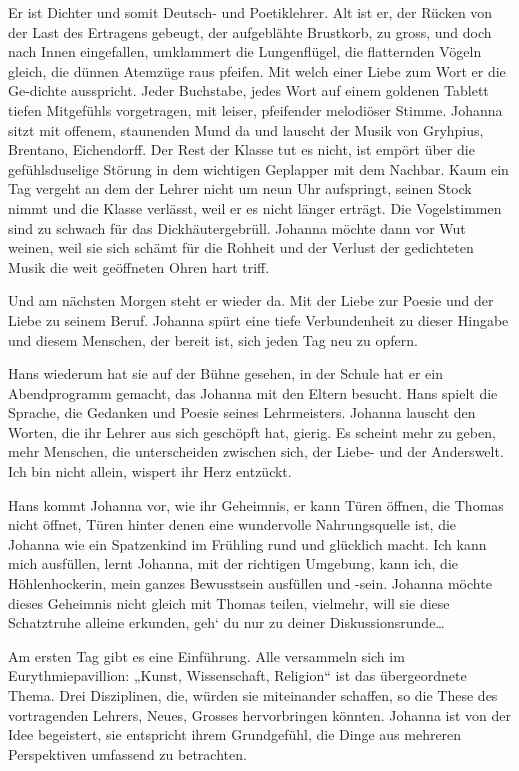 \documentclass[10pt,titlepage,a5paper]{book}
\begin{document}
Er ist Dichter und somit Deutsch- und Poetiklehrer. Alt ist er, der Rücken von der Last des Ertragens gebeugt, der aufgeblähte Brustkorb, zu gross, und doch nach Innen eingefallen, umklammert die Lungenflügel, die flatternden Vögeln gleich, die dünnen Atemzüge raus pfeifen. Mit welch einer Liebe zum Wort er die Ge-dichte ausspricht. Jeder Buchstabe, jedes Wort auf einem goldenen Tablett tiefen Mitgefühls vorgetragen, mit leiser, pfeifender melodiöser Stimme. Johanna sitzt mit offenem, staunenden Mund da und lauscht der Musik von Gryhpius, Brentano, Eichendorff. Der Rest der Klasse tut es nicht, ist empört über die gefühlsduselige Störung in dem wichtigen Geplapper mit dem Nachbar. Kaum ein Tag  vergeht an dem der Lehrer nicht um neun Uhr aufspringt, seinen Stock nimmt und die Klasse verlässt, weil er es nicht länger erträgt. Die Vogelstimmen sind zu schwach für das Dickhäutergebrüll. Johanna möchte dann vor Wut weinen, weil sie sich schämt für die Rohheit und der Verlust der gedichteten Musik die weit geöffneten Ohren hart triff.

Und am nächsten Morgen steht er wieder da. Mit der Liebe zur Poesie und der Liebe zu seinem Beruf. Johanna spürt eine tiefe Verbundenheit zu dieser Hingabe und diesem Menschen, der bereit ist, sich jeden Tag neu zu opfern.

Hans wiederum hat sie auf der Bühne gesehen, in der Schule hat er ein Abendprogramm gemacht, das Johanna mit den Eltern besucht. Hans spielt die Sprache, die Gedanken und Poesie seines Lehrmeisters. Johanna lauscht den Worten, die ihr Lehrer aus sich geschöpft hat, gierig. Es scheint mehr zu geben, mehr Menschen, die unterscheiden zwischen sich, der Liebe- und der Anderswelt. Ich bin nicht allein, wispert ihr Herz entzückt.

Hans kommt Johanna vor, wie ihr Geheimnis, er kann Türen öffnen, die Thomas nicht öffnet, Türen hinter denen eine wundervolle Nahrungsquelle ist, die Johanna wie ein Spatzenkind im Frühling rund und glücklich macht. Ich kann mich ausfüllen, lernt Johanna, mit der richtigen Umgebung, kann ich, die Höhlenhockerin, mein ganzes Bewusstsein ausfüllen und -sein. Johanna möchte dieses Geheimnis nicht gleich mit Thomas teilen, vielmehr, will sie diese Schatztruhe alleine erkunden, geh` du nur zu deiner Diskussionsrunde\dots 

Am ersten Tag gibt es eine Einführung. Alle versammeln sich im Eurythmiepavillion: „Kunst, Wissenschaft, Religion“ ist das übergeordnete Thema. Drei Disziplinen, die, würden sie miteinander schaffen, so die These des vortragenden Lehrers, Neues, Grosses hervorbringen könnten. Johanna ist von der Idee begeistert, sie entspricht ihrem Grundgefühl,  die Dinge aus mehreren Perspektiven umfassend zu betrachten.
\end{document}
